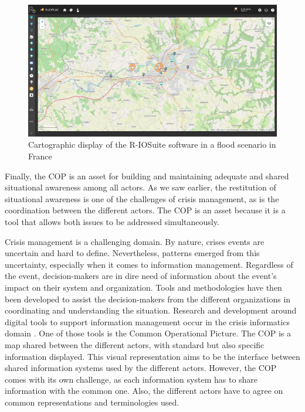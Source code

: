 \begin{figure}[htb]
    \centering
    \includegraphics[width=\textwidth]{figures/chap-1/rio.pdf}
    \caption{Cartographic display of the R-IOSuite software in a flood scenario in France\protect\footnotemark}
    \label{context:cop}
\end{figure}

Finally, the COP is an asset for building and maintaining adequate and shared situational awareness among all actors.
As we saw earlier, the restitution of situational awareness is one of the challenges of crisis management, as is the coordination between the different actors.
The COP is an asset because it is a tool that allows both issues to be addressed simultaneously.

Crisis management is a challenging domain.
By nature, crises events are uncertain and hard to define.
Nevertheless, patterns emerged from this uncertainty, especially when it comes to information management.
Regardless of the event, decision-makers are in dire need of information about the event's impact on their system and organization.
Tools and methodologies have then been developed to assist the decision-makers from the different organizations in coordinating and understanding the situation.
Research and development around digital tools to support information management occur in the crisis informatics domain \parencite{palenCrisisInformaticsHumancentered2020}.
One of those tools is the Common Operational Picture.
The COP is a map shared between the different actors, with standard but also specific information displayed.
This visual representation aims to be the interface between shared information systems used by the different actors.
However, the COP comes with its own challenge, as each information system has to share information with the common one.
Also, the different actors have to agree on common representations and terminologies used.

